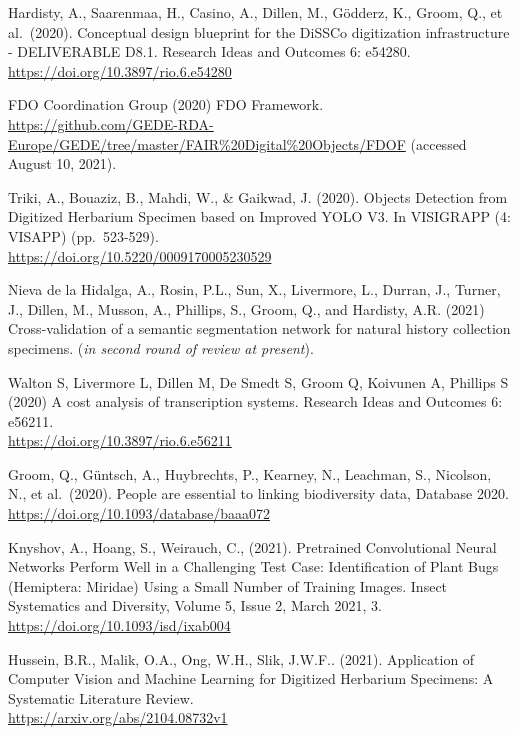 \begin{thebibliography}{9}
 Hardisty, A., Saarenmaa, H., Casino, A., Dillen, M., Gödderz,
K., Groom, Q., et al.~(2020). Conceptual design blueprint for the DiSSCo
digitization infrastructure - DELIVERABLE D8.1. Research Ideas and
Outcomes 6: e54280.\\
\url{https://doi.org/10.3897/rio.6.e54280}

 FDO Coordination Group (2020) FDO Framework.\\
\url{https://github.com/GEDE-RDA-Europe/GEDE/tree/master/FAIR\%20Digital\%20Objects/FDOF}
(accessed August 10, 2021).

 Triki, A., Bouaziz, B., Mahdi, W., \& Gaikwad, J. (2020).
Objects Detection from Digitized Herbarium Specimen based on Improved
YOLO V3. In VISIGRAPP (4: VISAPP) (pp.~523-529).\\
\url{https://doi.org/10.5220/0009170005230529}

 Nieva de la Hidalga, A., Rosin, P.L., Sun, X., Livermore, L.,
Durran, J., Turner, J., Dillen, M., Musson, A., Phillips, S., Groom, Q.,
and Hardisty, A.R. (2021) Cross-validation of a semantic segmentation
network for natural history collection specimens. (\emph{in second round
of review at present}).

 Walton S, Livermore L, Dillen M, De Smedt S, Groom Q, Koivunen
A, Phillips S (2020) A cost analysis of transcription systems. Research
Ideas and Outcomes 6: e56211.\\
\url{https://doi.org/10.3897/rio.6.e56211}

 Groom, Q., Güntsch, A., Huybrechts, P., Kearney, N., Leachman,
S., Nicolson, N., et al.~(2020). People are essential to linking
biodiversity data, Database 2020.\\
\url{https://doi.org/10.1093/database/baaa072}

 Knyshov, A., Hoang, S., Weirauch, C., (2021). Pretrained
Convolutional Neural Networks Perform Well in a Challenging Test Case:
Identification of Plant Bugs (Hemiptera: Miridae) Using a Small Number
of Training Images. Insect Systematics and Diversity, Volume 5, Issue 2,
March 2021, 3.\\
\url{https://doi.org/10.1093/isd/ixab004}

 Hussein, B.R., Malik, O.A., Ong, W.H., Slik, J.W.F.. (2021).
Application of Computer Vision and Machine Learning for Digitized
Herbarium Specimens: A Systematic Literature Review.\\
\url{https://arxiv.org/abs/2104.08732v1}


\end{thebibliography}
